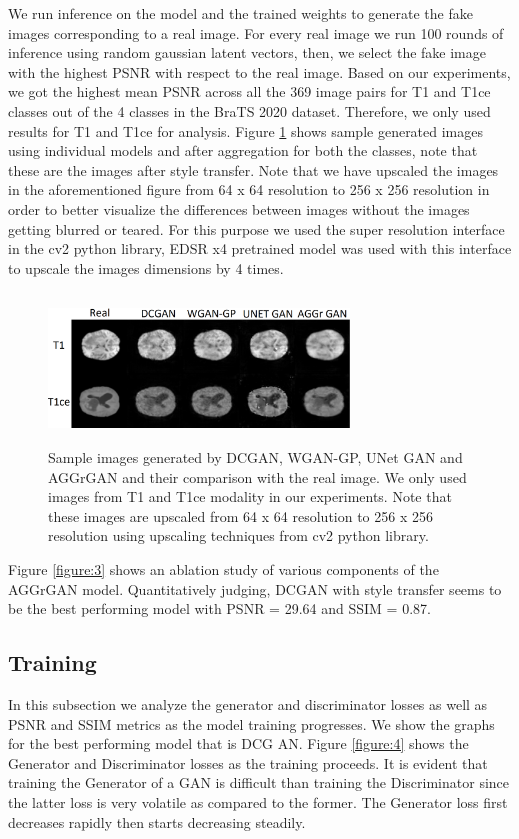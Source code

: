 \documentclass[10pt,journal,compsoc]{IEEEtran}
\begin{document}
We run inference on the model and the trained weights to generate the fake images corresponding to a real image. For every real image we run 100 rounds of inference using
random gaussian latent vectors, then, we select the fake image with the highest PSNR with respect to the real image. Based on our experiments, we got the highest mean PSNR
across all the 369 image pairs for T1 and T1ce classes out of the 4 classes in the BraTS 2020 dataset. Therefore, we only used results for T1 and T1ce for analysis. Figure 
\ref{figure:2} shows sample generated images using individual models and after aggregation for both the classes, note that these are the images after style transfer. Note
that we have upscaled the images in the aforementioned figure from 64 x 64 resolution to 256 x 256 resolution in order to better visualize the differences between images
without the images getting blurred or teared. For this purpose we used the super resolution interface in the cv2 python library, EDSR x4 pretrained model was used with
this interface to upscale the images dimensions by 4 times.

\begin{figure}[h]
\includegraphics[width=8cm, height=4cm]{upscaled_grid_with_labels.png}
\caption{
  Sample images generated by DCGAN, WGAN-GP, UNet GAN and AGGrGAN and their comparison with the real image. We only used images from T1 and T1ce modality in our experiments. Note that these images are upscaled from 64 x 64 resolution to 256 x 256 resolution using upscaling techniques from cv2 python library.
}
\label{figure:2}
\end{figure}

Figure \ref{figure:3} shows an ablation study of various components of the AGGrGAN model. Quantitatively judging, DCGAN with style transfer seems to be the best performing
model with PSNR = 29.64 and SSIM = 0.87.

\subsection{Training}

In this subsection we analyze the generator and discriminator losses as well as PSNR and SSIM metrics as the model training progresses. We show the graphs for the best
performing model that is DCG    AN. Figure \ref{figure:4} shows the Generator and Discriminator losses as the training proceeds. It is evident that training the Generator of
a GAN is difficult than training the Discriminator since the latter loss is very volatile as compared to the former. The Generator loss first decreases rapidly then
starts decreasing steadily. 
\end{document}
